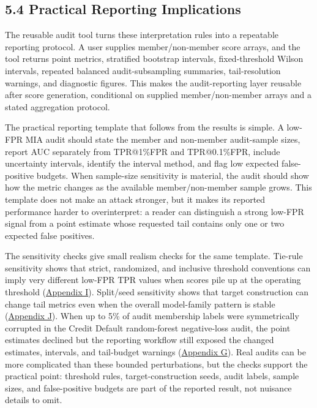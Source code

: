 \documentclass[
  10pt,
  twocolumn]{article}
\begin{document}
\hypertarget{practical-reporting-implications}{%
\subsection{5.4 Practical Reporting Implications}\label{practical-reporting-implications}}

The reusable audit tool turns these interpretation rules into a repeatable reporting protocol. A user supplies member/non-member score arrays, and the tool returns point metrics, stratified bootstrap intervals, fixed-threshold Wilson intervals, repeated balanced audit-subsampling summaries, tail-resolution warnings, and diagnostic figures. This makes the audit-reporting layer reusable after score generation, conditional on supplied member/non-member arrays and a stated aggregation protocol.

The practical reporting template that follows from the results is simple. A low-FPR MIA audit should state the member and non-member audit-sample sizes, report AUC separately from TPR@1\%FPR and TPR@0.1\%FPR, include uncertainty intervals, identify the interval method, and flag low expected false-positive budgets. When sample-size sensitivity is material, the audit should show how the metric changes as the available member/non-member sample grows. This template does not make an attack stronger, but it makes its reported performance harder to overinterpret: a reader can distinguish a strong low-FPR signal from a point estimate whose requested tail contains only one or two expected false positives.

The sensitivity checks give small realism checks for the same template. Tie-rule sensitivity shows that strict, randomized, and inclusive threshold conventions can imply very different low-FPR TPR values when scores pile up at the operating threshold (\protect\hyperlink{appendix-i-tie-rule-sensitivity}{Appendix I}). Split/seed sensitivity shows that target construction can change tail metrics even when the overall model-family pattern is stable (\protect\hyperlink{appendix-j-splitseed-sensitivity}{Appendix J}). When up to 5\% of audit membership labels were symmetrically corrupted in the Credit Default random-forest negative-loss audit, the point estimates declined but the reporting workflow still exposed the changed estimates, intervals, and tail-budget warnings (\protect\hyperlink{appendix-g-label-uncertainty-check}{Appendix G}). Real audits can be more complicated than these bounded perturbations, but the checks support the practical point: threshold rules, target-construction seeds, audit labels, sample sizes, and false-positive budgets are part of the reported result, not nuisance details to omit.
\end{document}
